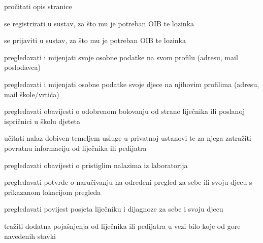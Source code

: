 			
			\begin{packed_enum}
				\item  {}
				
				\begin{packed_enum}
					
					\item pročitati opis stranice
					\item se registrirati u sustav, za što mu je potreban OIB te lozinka
					\item se prijaviti u sustav, za što mu je potreban OIB te lozinka
					
				\end{packed_enum}
			
				\item  {}
				
				\begin{packed_enum}
					
					\item pregledavati i mijenjati svoje osobne podatke na svom profilu (adresu, mail poslodavca)
					\item pregledavati i mijenjati osobne podatke svoje djece na njihovim profilima (adresu, mail škole/vrtića)
					\item pregledavati obavijesti o odobrenom bolovanju od strane liječnika ili poslanoj ispričnici u školu djeteta
					\item učitati nalaz dobiven temeljem usluge u privatnoj ustanovi te za njega zatražiti povratnu informaciju od liječnika ili pedijatra
					\item pregledavati obavijesti o pristiglim nalazima iz laboratorija
					\item pregledavati potvrde o naručivanju na određeni pregled za sebe ili svoju djecu s prikazanom lokacijom pregleda
					\item pregledavati povijest posjeta liječniku i dijagnoze za sebe i svoju djecu
					\item tražiti dodatna pojašnjenja od liječnika ili pedijatra u vezi bilo koje od gore navedenih stavki
				\end{packed_enum}
				
				\item  {}
				
				\begin{packed_enum}
					

\end{packed_enum}
\end{packed_enum}
